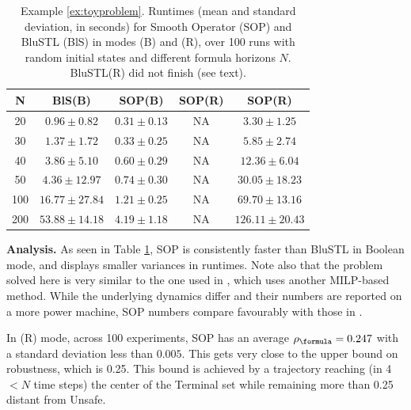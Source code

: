 \begin{exmp}
\begin{table}[tb]
\small
\begin{center}
\caption{{\small Example \ref{ex:toyproblem}. Runtimes (mean and standard deviation, in seconds) for Smooth Operator (SOP) and BluSTL (BlS) in modes (B) and (R), over 100 runs with random initial states and different formula horizons $N$. BluSTL(R) did not finish (see text).}}
\vspace{-5pt}
\label{tbl:time_performance_toy}
\begin{tabular} {|c|c|c|c|c|}
	\hline
	N & BlS(B) & SOP(B) & SOP(R) & SOP(R) \\ \hline
	20 & $0.96 \pm 0.82$ &  $\mathbf{0.31 \pm 0.13}$  & NA & $3.30 \pm 1.25$ \\ \hline
	30 & $1.37 \pm 1.72$ &  $\mathbf{0.33 \pm 0.25}$  & NA & $5.85 \pm 2.74$\\ \hline
	40 & $3.86 \pm 5.10$ &  $\mathbf{0.60 \pm 0.29}$  & NA & $12.36 \pm 6.04$\\ \hline
	50 & $4.36 \pm 12.97$&  $\mathbf{0.74 \pm 0.30}$ & NA & $30.05 \pm 18.23$\\ \hline
	100& $16.77 \pm 27.84$ & $\mathbf{1.21 \pm 0.25}$ & NA & $69.70 \pm 13.16$ \\ \hline
	200& $53.88 \pm 14.18$& $\mathbf{4.19 \pm 1.18}$ & NA & $126.11 \pm 20.43$ \\ \hline
\end{tabular}	
\end{center}
\end{table}

\textbf{Analysis.}
As seen in Table \ref{tbl:time_performance_toy}, SOP is consistently faster than BluSTL in Boolean mode, and displays smaller variances in runtimes. 
Note also that the problem solved here is very similar to the one used in \cite{Saha_acc16}, which uses another MILP-based method. 
While the underlying dynamics differ and their numbers are reported on a more power machine, 
SOP numbers compare favourably with those in \cite{Saha_acc16}.

In (R) mode, across 100 experiments, SOP has an average $\rob_{\formula}=0.247$ with a standard deviation less than $0.005$. 
This gets very close to the upper bound on robustness, which is 0.25.
This bound is achieved by a trajectory reaching (in 4$<N$ time steps) the center of the Terminal set while remaining more than 0.25 distant from Unsafe. 
\end{exmp}

